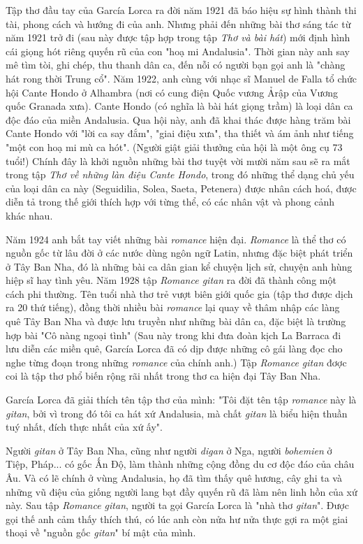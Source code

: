 \documentclass[../main.tex]{subfiles}
\begin{document}
\begin{multicols}{2}
Tập thơ đầu tay của García Lorca ra đời năm 1921 đã báo hiệu sự hình thành thi tài, phong cách và hướng đi của anh. Nhưng phải đến những bài thơ sáng tác từ năm 1921 trở đi (sau này được tập hợp trong tập \textit{Thơ và bài hát}) mới định hình cái giọng hót riêng quyến rũ của con "hoạ mi Andalusia". Thời gian này anh say mê tìm tòi, ghi chép, thu thanh dân ca, đến nỗi có người bạn gọi anh là "chàng hát rong thời Trung cổ". Năm 1922, anh cùng với nhạc sĩ Manuel de Falla tổ chức hội Cante Hondo ở Alhambra (nơi có cung điện Quốc vương Ảrập của Vương quốc Granada xưa). Cante Hondo (có nghĩa là bài hát giọng trầm) là loại dân ca độc đáo của miền Andalusia. Qua hội này, anh đã khai thác được hàng trăm bài Cante Hondo với "lời ca say đắm", "giai điệu xưa", tha thiết và ám ảnh như tiếng "một con hoạ mi mù ca hót". (Người giật giải thưởng của hội là một ông cụ 73 tuổi!) Chính đây là khởi nguồn những bài thơ tuyệt vời mười năm sau sẽ ra mắt trong tập \textit{Thơ về những làn điệu Cante Hondo}, trong đó những thể dạng chủ yếu của loại dân ca này (Seguidilia, Solea, Saeta, Petenera) được nhân cách hoá, được diễn tả trong thế giới thích hợp với từng thể, có các nhân vật và phong cảnh khác nhau. 
 
Năm 1924 anh bắt tay viết những bài \textit{romance} hiện đại. \textit{Romance} là thể thơ có nguồn gốc từ lâu đời ở các nước dùng ngôn ngữ Latin, nhưng đặc biệt phát triển ở Tây Ban Nha, đó là những bài ca dân gian kể chuyện lịch sử, chuyện anh hùng hiệp sĩ hay tình yêu. Năm 1928 tập \textit{Romance gitan} ra đời đã thành công một cách phi thường. Tên tuổi nhà thơ trẻ vượt biên giới quốc gia (tập thơ được dịch ra 20 thứ tiếng), đồng thời nhiều bài \textit{romance} lại quay về thâm nhập các làng quê Tây Ban Nha và được lưu truyền như những bài dân ca, đặc biệt là trường hợp bài "Cô nàng ngoại tình" (Sau này trong khi đưa đoàn kịch La Barraca đi lưu diễn các miền quê, García Lorca đã có dịp được những cô gái làng đọc cho nghe từng đoạn trong những \textit{romance} của chính anh.) Tập \textit{Romance gitan} đơợc coi là tập thơ phổ biến rộng rãi nhất trong thơ ca hiện đại Tây Ban Nha. 
 
García Lorca đã giải thích tên tập thơ của mình: "Tôi đặt tên tập \textit{romance }này là \textit{gitan}, bởi vì trong đó tôi ca hát xứ Andalusia, mà chất \textit{gitan }là biểu hiện thuần tuý nhất, đích thực nhất của xứ ấy". 
 
Người \textit{gitan} ở Tây Ban Nha, cũng như người \textit{digan} ở Nga, người \textit{bohemien} ở Tiệp, Pháp... có gốc Ấn Độ, làm thành những cộng đồng du cơ độc đáo của châu Âu. Và có lẽ chính ở vùng Andalusia, họ đã tìm thấy quê hương, cây ghi ta và những vũ điệu của giống người lang bạt đầy quyến rũ đã làm nên linh hồn của xứ này. Sau tập \textit{Romance gitan}, người ta gọi García Lorca là "nhà thơ \textit{gitan}". Được gọi thế anh cảm thấy thích thú, có lúc anh còn nửa hư nửa thực gợi ra một giai thoại về "nguồn gốc \textit{gitan}" bí mật của mình. 
 

\end{multicols}
\end{document}
